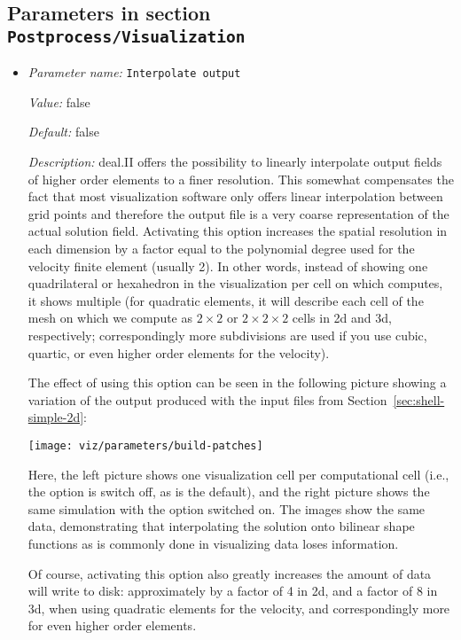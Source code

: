 \subsection{Parameters in section \tt Postprocess/Visualization}
\label{parameters:Postprocess/Visualization}

\begin{itemize}
\item {\it Parameter name:} {\tt Interpolate output}
\label{parameters:Postprocess/Visualization/Interpolate output}


{\it Value:} false


{\it Default:} false


{\it Description:} deal.II offers the possibility to linearly interpolate output fields of higher order elements to a finer resolution. This somewhat compensates the fact that most visualization software only offers linear interpolation between grid points and therefore the output file is a very coarse representation of the actual solution field. Activating this option increases the spatial resolution in each dimension by a factor equal to the polynomial degree used for the velocity finite element (usually 2). In other words, instead of showing one quadrilateral or hexahedron in the visualization per cell on which \aspect{} computes, it shows multiple (for quadratic elements, it will describe each cell of the mesh on which we compute as $2\times 2$ or $2\times 2\times 2$ cells in 2d and 3d, respectively; correspondingly more subdivisions are used if you use cubic, quartic, or even higher order elements for the velocity).

The effect of using this option can be seen in the following picture showing a variation of the output produced with the input files from Section~\ref{sec:shell-simple-2d}:

\begin{center}  \texttt{[image: viz/parameters/build-patches]}\end{center}Here, the left picture shows one visualization cell per computational cell (i.e., the option is switch off, as is the default), and the right picture shows the same simulation with the option switched on. The images show the same data, demonstrating that interpolating the solution onto bilinear shape functions as is commonly done in visualizing data loses information.

Of course, activating this option also greatly increases the amount of data \aspect{} will write to disk: approximately by a factor of 4 in 2d, and a factor of 8 in 3d, when using quadratic elements for the velocity, and correspondingly more for even higher order elements.



\end{itemize}
